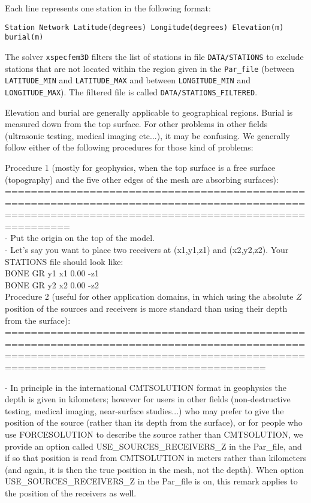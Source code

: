 Each line represents one station in the following format:
{\small
\begin{verbatim}
Station Network Latitude(degrees) Longitude(degrees) Elevation(m) burial(m)
\end{verbatim}
}
The solver \texttt{xspecfem3D} filters the list of stations in file
\texttt{DATA/STATIONS} to exclude stations that are not located within
the region given in the \texttt{Par\_file} (between \texttt{LATITUDE\_MIN}
and \texttt{LATITUDE\_MAX} and between \texttt{LONGITUDE\_MIN} and
\texttt{LONGITUDE\_MAX}). The filtered file is called \texttt{DATA/STATIONS\_FILTERED}.

Elevation and burial are generally applicable to geographical regions.
Burial is measured down from the top surface. For other problems in other
fields (ultrasonic testing, medical imaging etc...),
it may be confusing. We generally follow either of the following
procedures for those kind of problems:

Procedure 1 (mostly for geophysics, when the top surface is a free surface (topography) and the five other edges of the mesh are absorbing surfaces):\\
====================================================================================================================================================\\

- Put the origin on the top of the model.\\

- Let's say you want to place two receivers at (x1,y1,z1) and
(x2,y2,z2). Your STATIONS file should look like:\\

BONE  GR  y1  x1  0.00  -z1\\
BONE  GR  y2  x2  0.00  -z2\\

Procedure 2 (useful for other application domains, in which using the absolute $Z$ position of the sources and receivers is more standard than using their depth from the surface):\\
==================================================================================================================================================================================

- In principle in the international CMTSOLUTION format in geophysics
the depth is given in kilometers; however for users in other fields (non-destructive testing, medical imaging, near-surface studies...) who may prefer to give the position of the source (rather than its depth from the surface), or for people who use FORCESOLUTION to describe the source rather than CMTSOLUTION, we provide an option called USE\_SOURCES\_RECEIVERS\_Z in the Par\_file, and if so that position is read from CMTSOLUTION in meters rather than kilometers (and again, it is then the true position in the mesh, not the depth). When option USE\_SOURCES\_RECEIVERS\_Z in the Par\_file is on, this remark applies to the position of the receivers as well.\\

